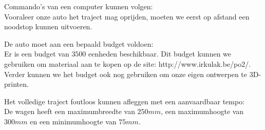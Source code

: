 \documentclass[a4paper,twoside,kulak]{kulakreport}
\begin{document}
	
	\bigskip
	
	
	Commando's van een computer kunnen volgen:\\
	Vooraleer onze auto het traject mag oprijden, moeten we eerst op afstand een noodstop kunnen uitvoeren. 
	
	
	
	\bigskip
	
	De auto moet aan een bepaald budget voldoen:\\
	Er is een budget van $3500$ eenheden beschikbaar. Dit budget kunnen we gebruiken om materiaal aan te kopen op de site: http://www.irkulak.be/po2/.
	Verder kunnen we het budget ook nog gebruiken om onze eigen ontwerpen te 3D-printen. 
	
	\bigskip
	Het volledige traject foutloos kunnen afleggen met een aanvaardbaar tempo:\\
	De wagen heeft een maximumbreedte van $250mm$, een maximumhoogte van $300mm$ en een minimumhoogte van $75mm$.
	
	\bigskip
	
\end{document}
